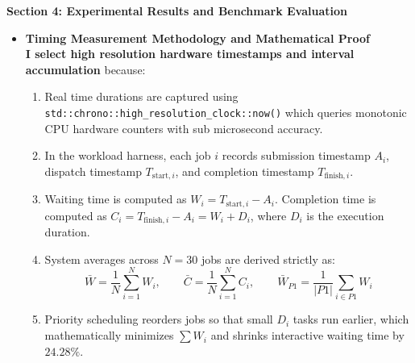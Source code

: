 \documentclass[10pt,a4paper]{article}
\begin{document}
\clearpage


\begin{center}
    {\Large \textbf{Section 4: Experimental Results and Benchmark Evaluation}}
\end{center}

\begin{itemize}[leftmargin=1.2em,noitemsep,topsep=2pt,parsep=1pt]
    \item \textbf{Timing Measurement Methodology and Mathematical Proof}\\[3pt]
    \textbf{I select high resolution hardware timestamps and interval accumulation} because:
    \begin{enumerate}[label=\arabic*),leftmargin=1.5em,noitemsep,topsep=1pt,parsep=1pt]
        \item Real time durations are captured using \texttt{std::chrono::high\_resolution\_clock::now()} which queries monotonic CPU hardware counters with sub microsecond accuracy.
        \item In the workload harness, each job $i$ records submission timestamp $A_i$, dispatch timestamp $T_{\text{start}, i}$, and completion timestamp $T_{\text{finish}, i}$.
        \item Waiting time is computed as $W_i = T_{\text{start}, i} - A_i$. Completion time is computed as $C_i = T_{\text{finish}, i} - A_i = W_i + D_i$, where $D_i$ is the execution duration.
        \item System averages across $N = 30$ jobs are derived strictly as:
        $$\bar{W} = \frac{1}{N} \sum_{i=1}^N W_i, \qquad \bar{C} = \frac{1}{N} \sum_{i=1}^N C_i, \qquad \bar{W}_{P1} = \frac{1}{|P1|} \sum_{i \in P1} W_i$$
        \item Priority scheduling reorders jobs so that small $D_i$ tasks run earlier, which mathematically minimizes $\sum W_i$ and shrinks interactive waiting time by $24.28\%$.
    \end{enumerate}


\end{itemize}
\end{document}
